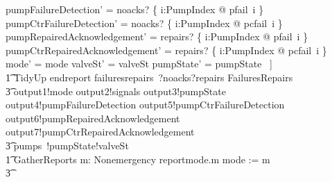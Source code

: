 \documentclass{report} %
\begin{document}
\begin{circus}
                pumpFailureDetection' = noacks? \cap \{ i:PumpIndex @ pfail~i \} \land \\
                pumpCtrFailureDetection' = noacks? \cap \{ i:PumpIndex @ pcfail~i \} \land \\
                pumpRepairedAcknowledgement' = repairs? \cap \{ i:PumpIndex @ pfail~i \} \land \\
                pumpCtrRepairedAcknowledgement' = repairs? \cap \{ i:PumpIndex @ pcfail~i \} \land \\
                mode' = mode \land valveSt' = valveSt \land pumpState' = pumpState
            ~] \\
        \t1 TidyUp \circdef endreport \then failuresrepairs~?noacks?repairs \then \lschexpract FailuresRepairs \rschexpract \circseq \\
            \t3 output1!mode \then output2!signals \then output3!pumpState \then output4!pumpFailureDetection \then output5!pumpCtrFailureDetection \then output6!pumpRepairedAcknowledgement \then output7!pumpCtrRepairedAcknowledgement \then \\
            \t3 pumps~!pumpState!valveSt \then \Skip \\ %
        \t1 GatherReports \circdef \Extchoice m: Nonemergency \circspot reportmode.m \then mode := m
                    \\ %
                    \t3 \extchoice

\end{circus}
\end{document}

